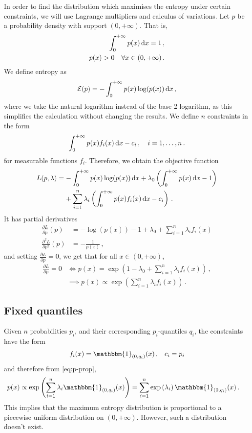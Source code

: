 \documentclass{article}
\newcommand{\dd}{{\rm d}}
\begin{document}
%
In order to find the distribution which maximises
the entropy under certain constraints,
we will use Lagrange multipliers and calculus of variations.
Let $p$ be a probability density with support $(0, +\infty)$.
That is,
%
\begin{align*}
	\int_0^{+\infty} p(x) \, \dd x = 1 \,, \\
	p(x) > 0 \quad \forall x \in (0, +\infty) \,.
\end{align*}
We define entropy as
%
\begin{align*}
	{\cal E}(p) = -\int_0^{+\infty} p(x) \log(p(x)) \, \dd x \,,
\end{align*}
%
where we take the  natural logarithm instead of the base 2 logarithm,
as this simplifies the calculation without changing the results.
We define $n$ constraints in the form
\begin{align*}
	\int_0^{+\infty} p(x) f_i(x) \, \dd x - c_i \,, \quad i = 1, \dots, n \,.
\end{align*}
%
for measurable functions $f_i$.
Therefore, we obtain the objective function
%
\begin{align*}
	L(p, \lambda) &= -\int_0^{+\infty} p(x) \log(p(x)) \, \dd x
		+ \lambda_0 \left(\int_0^{+\infty} p(x) \, \dd x - 1\right) \\
	&\ \phantom{=} + \sum_{i=1}^n \lambda_i
		\left(\int_0^{+\infty} p(x) f_i(x) \, \dd x - c_i\right) \,.
\end{align*}
%
It has partial derivatives
\begin{align*}
	\frac{\partial L}{\partial p}(p)
		&= -\log (p(x)) - 1 + \lambda_0 + \sum_{i = 1}^n \lambda_i f_i(x) \\
	\frac{\partial ^ 2 L}{\partial p ^ 2}(p)
		&= -\frac{1}{p(x)} \,,
\end{align*}
%
and setting $\frac{\partial L}{\partial p} = 0$,
we get that for all $x \in (0, +\infty)$,
%
\begin{align}
	\frac{\partial L}{\partial p} = 0 &\iff p(x)
		= \exp\left(1 - \lambda_0 + \sum_{i = 1}^n \lambda_i f_i(x)\right)
		\,, \nonumber\\
	&\implies p(x) \propto \exp\left(\sum_{i = 1}^n \lambda_i f_i(x)\right) \,. 
	\label{eq:p-prop}
\end{align}
%
\subsection*{Fixed quantiles}
%
Given $n$ probabilities $p_i$, and their corresponding $p_i$-quantiles $q_i$,
the constraints have the form
\begin{align*}
	f_i(x) = \mathbbm{1}_{(0, q_i)}(x) \,, &\quad c_i = p_i \\
\end{align*}
%
and therefore from \eqref{eq:p-prop},
%
\begin{align*}
	p(x) \propto \exp\left(\sum_{i = 1}^n \lambda_i
		\mathbbm{1}_{(0, q_i)}(x) \right)
		&= \sum_{i = 1}^n \exp\left(\lambda_i \right) 
		\mathbbm{1}_{(0, q_i)}(x) \,.
\end{align*}
%
This implies that the maximum entropy distribution is proportional to a
piecewise uniform distribution on $(0, +\infty)$.
However, such a distribution doesn't exist.
%
\end{document}
